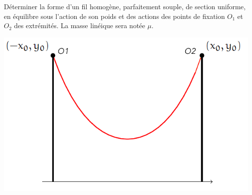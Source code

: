 \correction{ 
\begin{enumerate}
\item \[T_O = \left\{
\begin{array}{rcl}
	\overrightarrow{R}=-(\frac{P_m}{2}+P_0).L.l.\overrightarrow{z} \\
	\overrightarrow{M_0}=-(\frac{P_m}{3}+\frac{P_0}{2}).L^2.l.\overrightarrow{x}
\end{array}\right. \text{en O}\]
\end{enumerate}
}
\newpage



Déterminer la forme d'un fil homogène, parfaitement souple, de section uniforme, en équilibre sous l'action de son poids et des actions des points de fixation $O_1$ et $O_2$ des extrémités. La masse linéique sera notée $\mu$.

\begin{center}
\includegraphics[scale=0.5]{png/chainette.png}
\end{center}

\newpage